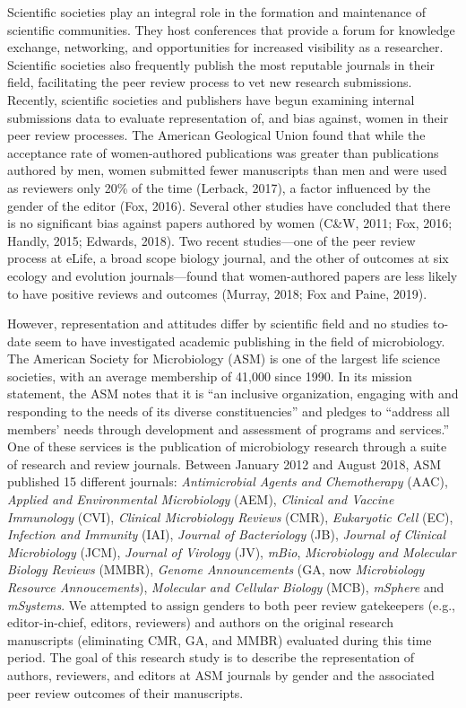 \documentclass[11pt,]{article}
\begin{document}
Scientific societies play an integral role in the formation and
maintenance of scientific communities. They host conferences that
provide a forum for knowledge exchange, networking, and opportunities
for increased visibility as a researcher. Scientific societies also
frequently publish the most reputable journals in their field,
facilitating the peer review process to vet new research submissions.
Recently, scientific societies and publishers have begun examining
internal submissions data to evaluate representation of, and bias
against, women in their peer review processes. The American Geological
Union found that while the acceptance rate of women-authored
publications was greater than publications authored by men, women
submitted fewer manuscripts than men and were used as reviewers only
20\% of the time (Lerback, 2017), a factor influenced by the gender of
the editor (Fox, 2016). Several other studies have concluded that there
is no significant bias against papers authored by women (C\&W, 2011;
Fox, 2016; Handly, 2015; Edwards, 2018). Two recent studies---one of the
peer review process at eLife, a broad scope biology journal, and the
other of outcomes at six ecology and evolution journals---found that
women-authored papers are less likely to have positive reviews and
outcomes (Murray, 2018; Fox and Paine, 2019).

However, representation and attitudes differ by scientific field and no
studies to-date seem to have investigated academic publishing in the
field of microbiology. The American Society for Microbiology (ASM) is
one of the largest life science societies, with an average membership of
41,000 since 1990. In its mission statement, the ASM notes that it is
``an inclusive organization, engaging with and responding to the needs
of its diverse constituencies'' and pledges to ``address all members'
needs through development and assessment of programs and services.'' One
of these services is the publication of microbiology research through a
suite of research and review journals. Between January 2012 and August
2018, ASM published 15 different journals: \emph{Antimicrobial Agents
and Chemotherapy} (AAC), \emph{Applied and Environmental Microbiology}
(AEM), \emph{Clinical and Vaccine Immunology} (CVI), \emph{Clinical
Microbiology Reviews} (CMR), \emph{Eukaryotic Cell} (EC),
\emph{Infection and Immunity} (IAI), \emph{Journal of Bacteriology}
(JB), \emph{Journal of Clinical Microbiology} (JCM), \emph{Journal of
Virology} (JV), \emph{mBio}, \emph{Microbiology and Molecular Biology
Reviews} (MMBR), \emph{Genome Announcements} (GA, now \emph{Microbiology
Resource Annoucements}), \emph{Molecular and Cellular Biology} (MCB),
\emph{mSphere} and \emph{mSystems}. We attempted to assign genders to
both peer review gatekeepers (e.g., editor-in-chief, editors, reviewers)
and authors on the original research manuscripts (eliminating CMR, GA,
and MMBR) evaluated during this time period. The goal of this research
study is to describe the representation of authors, reviewers, and
editors at ASM journals by gender and the associated peer review
outcomes of their manuscripts.
\end{document}
